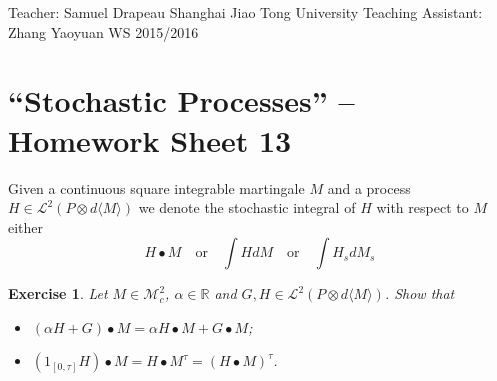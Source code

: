 \documentclass[DIV=classic,a4paper,10pt]{scrartcl}
\newtheorem{exercise}[theorem]{Exercise}
\theoremstyle{nonumberplain}
\numberwithin{equation}{section}
\begin{document}
\noindent
Teacher: Samuel Drapeau \hfill Shanghai Jiao Tong University \newline
Teaching Assistant: Zhang Yaoyuan \hfill WS 2015/2016

\smallskip
\noindent
\hrulefill

\smallskip

\setcounter{section}{13}

\pagestyle{empty}


\section*{``Stochastic Processes'' -- Homework Sheet 13}
\thispagestyle{empty}



Given a continuous square integrable martingale $M$ and a process $H\in \mathcal{L}^2(P\otimes d\langle M\rangle)$ we denote the stochastic integral of $H$ with respect to $M$ either
\begin{equation*}
    H\bullet M \quad \text{or}\quad \int H dM \quad\text{or}\quad \int H_s dM_s
\end{equation*}

\begin{exercise}
    Let $M\in \mathcal{M}_c^2$, $\alpha \in \mathbb{R}$ and $G,H \in \mathcal{L}^2(P\otimes d\langle M\rangle)$.
    Show that
    \begin{itemize}
        \item $(\alpha H+G)\bullet M=\alpha H\bullet M+G\bullet M$;
        \item $(1_{[0,\tau]}H)\bullet M=H\bullet M^\tau=(H\bullet M)^\tau$.
    \end{itemize}
\end{exercise}
\end{document}
